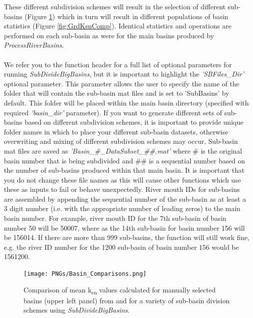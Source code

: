 \noindent
These different subdivision schemes will result in the selection of different sub-basins (Figure \ref{fig:BasinsComp}) which in turn will result in different populations of basin statistics (Figure \ref{fig:GrdKsnComp}). Identical statistics and operations are performed on each sub-basin as were for the main basins produced by \textit{ProcessRiverBasins}.

\paragraph{}We refer you to the function header for a full list of optional parameters for running \textit{SubDivideBigBasins}, but it is important to highlight the \textit{'SBFiles\_Dir'} optional parameter. This parameter allows the user to specify the name of the folder that will contain the sub-basin mat files and is set to 'SubBasins' by default. This folder will be placed within the main basin directory (specified with required \textit{'basin\_dir'} parameter). If you want to generate different sets of sub-basins based on different subdivision schemes, it is important to provide unique folder names in which to place your different sub-basin datasets, otherwise overwriting and mixing of different subdivision schemes may occur. Sub-basin mat files are saved as \textit{'Basin\_\#\_DataSubset\_\#\#.mat'} where \# is the original basin number that is being subdivided and \#\# is a sequential number based on the number of sub-basins produced within that main basin. It is important that you do not change these file names as this will cause other functions which use these as inputs to fail or behave unexpectedly. River mouth IDs for sub-basins are assembled by appending the sequential number of the sub-basin as at least a 3 digit number (i.e. with the appropriate number of leading zeros) to the main basin number. For example, river mouth ID for the 7th sub-basin of basin number 50 will be 50007, where as the 14th sub-basin for basin number 156 will be 156014. If there are more than 999 sub-basins, the function will still work fine, e.g. the river ID number for the 1200 sub-basin of basin number 156 would be 1561200.

\begin{figure}[H]
	\texttt{[image: PNGs/Basin\_Comparisons.png]}
	\caption{Comparison of mean k\textsubscript{sn} values calculated for manually selected basins (upper left panel) from  and for a variety of sub-basin division schemes using \textit{SubDivideBigBasins}.}
	\label{fig:BasinsComp}
\end{figure}

